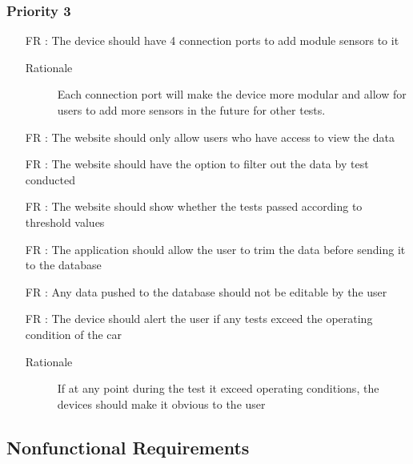 \documentclass[12pt]{article}
\newcounter{reqnum} %
\begin{document}
\subsubsection{Priority 3}
\begin{itemize}
  \item[FR \refstepcounter{reqnum}\thereqnum:] The device should have 4 connection ports to add module sensors to it
  \begin{description} \item[Rationale] Each connection port will make the device more modular and allow for users to add more sensors in the future for other tests.  \end{description}

  \item[FR \refstepcounter{reqnum}\thereqnum:] The website should only allow users who have access to view the data
  
  \item[FR \refstepcounter{reqnum}\thereqnum:] The website should have the option to filter out the data by test conducted
  
  \item[FR \refstepcounter{reqnum}\thereqnum:] The website should show whether the tests passed according to threshold values
  
  \item[FR \refstepcounter{reqnum}\thereqnum:] The application should allow the user to trim the data before sending it to the database
  
  \item[FR \refstepcounter{reqnum}\thereqnum:] Any data pushed to the database should not be editable by the user
  
  \item[FR \refstepcounter{reqnum}\thereqnum:] The device should alert the user if any tests exceed the operating condition of the car
  \begin{description} \item[Rationale] If at any point during the test it exceed operating conditions, the devices should make it obvious to the user  \end{description}
  
  \end{itemize}

\newpage
\subsection{Nonfunctional Requirements}
\end{document}
